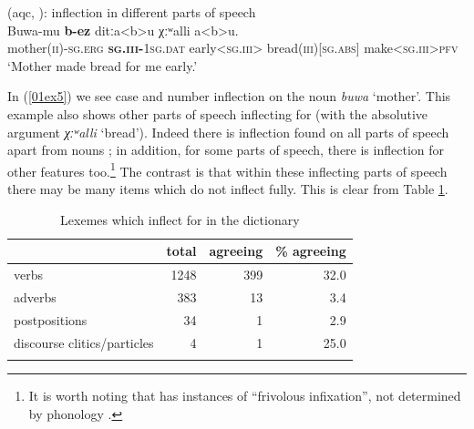 \documentclass[output=paper,colorlinks,citecolor=brown]{langscibook}
\begin{document}
\begin{exe}
	\ex {} (aqc, \citealt[349]{kibrik1994}): inflection in different parts of speech \label{01ex5} \\
	\gll Buwa-mu \textbf{b-ez} ditːa<b>u χːʷalli a<b>u. \\
	mother\textsc{(ii)-sg.erg}	\textsc{\textbf{sg.iii-}1sg.dat}	early\textsc{<sg.iii>}	bread\textsc{(iii)[sg.abs]}	make\textsc{<sg.iii>pfv} \\
	\trans ‘Mother made bread for me early.’
\end{exe}

In (\ref{01ex5}) we see case and number inflection on the noun \textit{buwa} `mother'. This example also shows other parts of speech inflecting for  (with the absolutive argument \textit{χːʷalli} `bread'). Indeed there is  inflection found on all parts of speech apart from nouns \citep[94--95]{chumakinacorbett2015}; in addition, for some parts of speech, there is inflection for other features too.\footnote{It is worth noting that  has instances of ``frivolous infixation'', not determined by phonology \citep{chumakinacorbett2015}.} The contrast is that within these inflecting parts of speech there may be many items which do not inflect fully. This is clear from Table \ref{01tab4}.

\begin{table}[ht]
	\centering
	\begin{tabularx}{0.75\textwidth}{lrrr}
		\lsptoprule
			& total & agreeing & \% agreeing \\
			\midrule
			verbs & 1248 & 399 & 32.0 \\
			adverbs & 383 & 13 & 3.4 \\
			postpositions & 34 & 1 & 2.9 \\
			discourse clitics/particles & 4 & 1 & 25.0 \\
		\lspbottomrule
	\end{tabularx}
	\caption{Lexemes which inflect for  in the  dictionary \citep[95]{chumakinacorbett2015}\protect\footnotemark}
	\label{01tab4}
\end{table}

\end{document}

